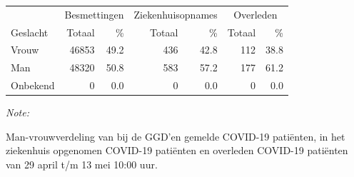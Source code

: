 \documentclass[
  english,
  man,floatsintext]{apa6}
\begin{document}
\begin{table}
\centering\begingroup\fontsize{11}{13}\selectfont

\begin{threeparttable}
\begin{tabular}{lrrrrrr}
\toprule
\multicolumn{1}{c}{ } & \multicolumn{2}{c}{Besmettingen} & \multicolumn{2}{c}{Ziekenhuisopnames} & \multicolumn{2}{c}{Overleden} \\
\cmidrule(l{3pt}r{3pt}){2-3} \cmidrule(l{3pt}r{3pt}){4-5} \cmidrule(l{3pt}r{3pt}){6-7}
Geslacht & Totaal & \% & Totaal & \% & Totaal & \%\\
\midrule
Vrouw & 46853 & 49.2 & 436 & 42.8 & 112 & 38.8\\
Man & 48320 & 50.8 & 583 & 57.2 & 177 & 61.2\\
Onbekend & 0 & 0.0 & 0 & 0.0 & 0 & 0.0\\
\bottomrule
\end{tabular}
\begin{tablenotes}
\item \textit{Note: } 
\item Man-vrouwverdeling van bij de GGD’en gemelde COVID-19 patiënten, in het ziekenhuis opgenomen COVID-19 patiënten en overleden COVID-19 patiënten van 29 april t/m 13 mei 10:00 uur.
\end{tablenotes}
\end{threeparttable}
\endgroup{}
\end{table}
\newpage
\end{document}
